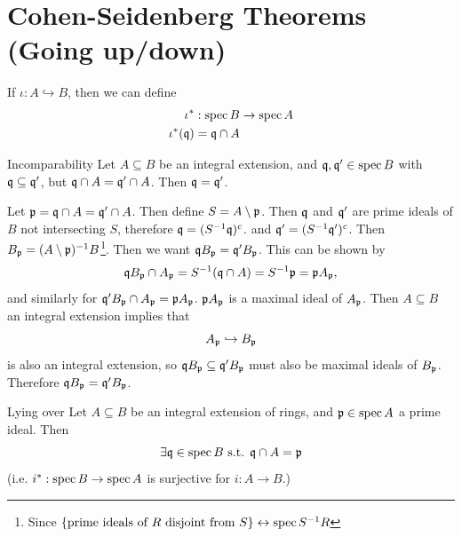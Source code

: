 \documentclass{article}
\begin{document}
\section{Cohen-Seidenberg Theorems (Going up/down)}
\begin{remark*}
    If $\iota: A \hookrightarrow B$, then we can define \begin{align*}
        \iota^{*} : \operatorname{spec} B &\to \operatorname{spec} A\\
        \iota^{*}(\mathfrak{q}) = \mathfrak{q} \cap A
    \end{align*}
\end{remark*}
\begin{fancyprop}{Incomparability}
    Let $A \subseteq B$ be an integral extension, and $\mathfrak{q}, \mathfrak{q}' \in \operatorname{spec} B$ with $\mathfrak{q} \subseteq \mathfrak{q}'$, but  $\mathfrak{q} \cap A = \mathfrak{q}' \cap A$. Then $\mathfrak{q} = \mathfrak{q}'$.
\end{fancyprop}
\proof 
Let $\mathfrak{p} = \mathfrak{q} \cap A = \mathfrak{q}' \cap A$. Then define $S = A \setminus \mathfrak{p}$. Then $\mathfrak{q}$ and $\mathfrak{q}'$ are prime ideals of $B$ not intersecting $S$, therefore $\mathfrak{q} = (S^{-1}\mathfrak{q})^{c}$. and $\mathfrak{q}' = (S^{-1}\mathfrak{q}')^{c}$. Then $B_{\mathfrak{p}} = (A \setminus \mathfrak{p})^{-1}B$\footnote{Since $\{ \text{prime ideals of $R$ disjoint from $S$} \} \leftrightarrow \operatorname{spec} S^{-1}R$}. Then we want $\mathfrak{q} B_{\mathfrak{p}} = \mathfrak{q}' B_{\mathfrak{p}}$. This can be shown by \[ \mathfrak{q} B_{\mathfrak{p}} \cap A_{\mathfrak{p}} = S^{-1}(\mathfrak{q} \cap A) = S^{-1} \mathfrak{p} = \mathfrak{p} A_{\mathfrak{p}},\] and similarly for $\mathfrak{q}' B_{\mathfrak{p}} \cap A_{\mathfrak{p}} = \mathfrak{p} A_{\mathfrak{p}}$. $\mathfrak{p} A_{\mathfrak{p}}$ is a maximal ideal of $A_{\mathfrak{p}}$. Then $A \subseteq B$ an integral extension implies that \[ A_{\mathfrak{p}} \hookrightarrow B_{\mathfrak{p}}\] is also an integral extension, so $\mathfrak{q} B_{\mathfrak{p}} \subseteq \mathfrak{q}' B_{\mathfrak{p}}$ must also be maximal ideals of $B_{\mathfrak{p}}$. Therefore $\mathfrak{q} B_{\mathfrak{p}} = \mathfrak{q}' B_{\mathfrak{p}}$. \endproof
\begin{fancyprop}{Lying over}
    Let $A \subseteq B$ be an integral extension of rings, and $\mathfrak{p} \in \operatorname{spec} A$ a prime ideal. Then \[
        \exists \mathfrak{q} \in \operatorname{spec} B \text{ s.t. } \mathfrak{q} \cap A = \mathfrak{p} 
    \]
    (i.e. $i^{*} : \operatorname{spec} B \to \operatorname{spec} A$ is surjective for $i : A \to B$.)
\end{fancyprop}
\proof \begin{center}
\end{center}
\end{document}
